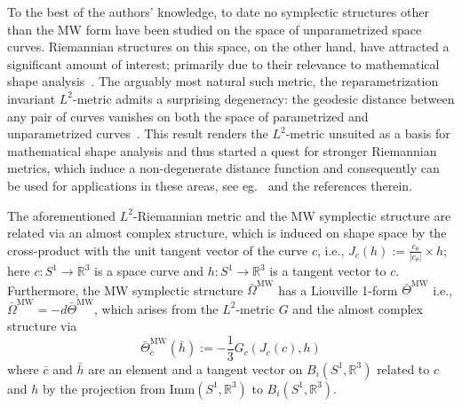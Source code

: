 \documentclass[12pt]{amsart}
\newcommand{\rev}[1]{#1}
\theoremstyle{definition}
\newcommand{\R}{\mathbb R}
\newcommand{\Imm}{\mathrm{Imm}}
\def\Om{\Omega}
\def\x{\times}
\def\R{{\mathbb R}}
\let\on=\operatorname
\begin{document}
To the best of the authors' knowledge, to date no symplectic structures other than the MW form have been studied on the space of unparametrized space curves. Riemannian structures on this space, on the other hand, have attracted a significant amount of interest;  primarily due to their relevance to mathematical shape analysis~\cite{younes2010shapes,srivastava2016functional,bauer2014overview}. The arguably most natural such metric, the reparametrization invariant $L^2$-metric admits a surprising degeneracy: the geodesic distance between any pair of curves vanishes on both the space of parametrized and unparametrized curves~\cite{michor2005vanishing,bauer2012vanishing}. This result renders the $L^2$-metric unsuited as a basis for mathematical shape analysis and thus started a quest for stronger Riemannian metrics, which induce a non-degenerate distance function and consequently can be used for applications in these areas, see eg.~\cite{michor_mumford2006,yezzi2005conformal,srivastava2010shape,bauer2017numerical} and the references therein. 

 The aforementioned $L^2$-Riemannian metric and the MW symplectic structure are related via an almost complex structure, which is induced on shape space by the cross-product with the unit tangent vector of the curve $c$, i.e., $J_c(h):=\frac{c_\theta}{|c_\theta|} \x h$; here $c:S^1\to\mathbb R^3$ is a space curve and $h:S^1\to\mathbb R^3$ is a tangent vector to $c$. Furthermore, the MW symplectic structure $\bar \Om^{\on{MW}}$ has a Liouville 1-form $\bar\Theta^{\operatorname{MW}}$ i.e., $\bar \Om^{\on{MW}}=-d \bar\Theta^{\operatorname{MW}}$, which arises from the $L^2$-metric $G$ and the almost complex structure via 
 \begin{equation}
 \bar\Theta^{\operatorname{MW}}_{\bar c}(\bar h):= -\frac{1}{3} G_c(J_c(c),h)
 \end{equation}
 \rev{where $\bar c$ and $\bar h$ are an element and a tangent vector on $B_i(S^1,\R^3)$ related to $c$ and $h$ by the projection from $\Imm(S^1,\R^3)$ to $B_i(S^1,\R^3)$.}
\end{document}
